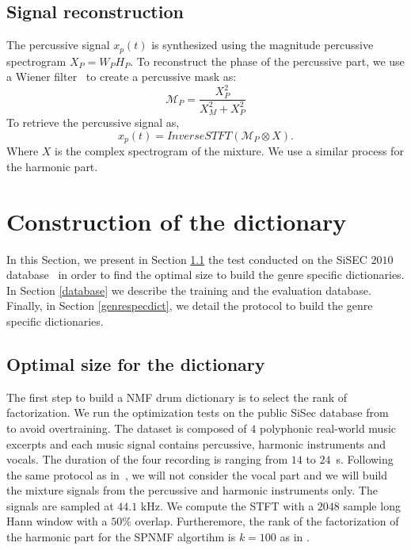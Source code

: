 \documentclass{article}
\begin{document}
 
\subsection{Signal reconstruction}

The percussive signal $x_p(t)$ is synthesized using the magnitude percussive spectrogram $X_P = W_PH_P$. To reconstruct the phase of the percussive part, we use a Wiener filter~\cite{liutkus2015generalized} to create a percussive mask as:
\begin{equation}
\mathcal{M}_P = \frac{X_P^2}{X_M^2 + X_P^2}
\end{equation} 
To retrieve the percussive signal as, 
\begin{equation}
x_p(t) = InverseSTFT(\mathcal{M}_P \otimes X).
\end{equation}
Where $X$ is the complex spectrogram of the mixture.
We use a similar process for the harmonic part.
%




\section{Construction of the dictionary}\label{ConstrucDict}

In this Section, we present in Section \ref{optimalsize} the test conducted on the SiSEC $2010$ database~\cite{SiSec10} in order to find the optimal size to build the genre specific dictionaries. In Section \ref{database} we describe the training and the evaluation database. Finally, in Section \ref{genrespecdict}, we detail the protocol to build the genre specific dictionaries. 

\subsection{Optimal size for the dictionary}\label{optimalsize}

The first step to build a NMF drum dictionary is to select the rank of factorization. We run the optimization tests on the public SiSec database from~\cite{SiSec10} to avoid overtraining. The dataset is composed of $4$ polyphonic real-world music excerpts and each music signal contains percussive, harmonic instruments and vocals. The duration of the four recording is ranging from $14$ to $24$~s. Following the same protocol as in~\cite{canadas2014percussive}, we will not consider the vocal part and we will build the mixture signals from the percussive and harmonic instruments only. The signals are sampled at $44.1$ kHz. We compute the STFT with a $2048$ sample long Hann window with a $50\%$ overlap. Furtheremore, the rank of the factorization of the harmonic part for the SPNMF algortihm is $k=100$ as in \cite{larocheJournalhidden}.
\end{document}
